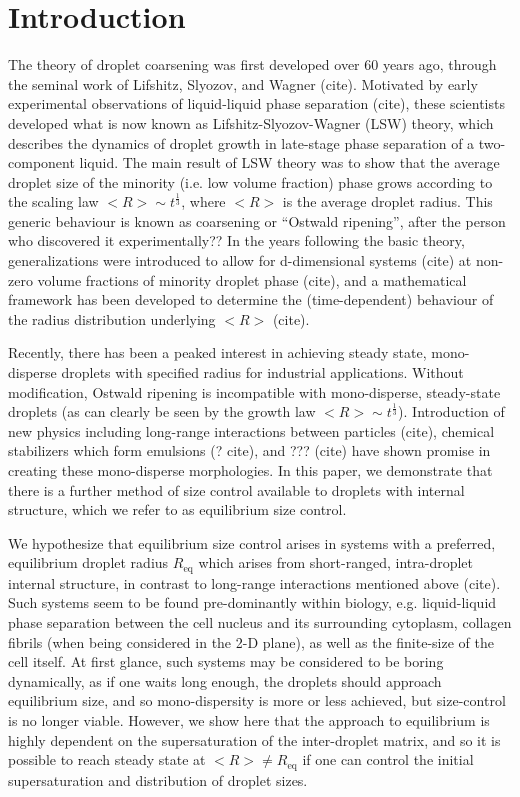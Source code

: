 \documentclass[12pt]{article}
\begin{document}

\section{Introduction}
The theory of droplet coarsening was first developed over 60 years ago, through the seminal work of Lifshitz, Slyozov, and Wagner (cite). Motivated by early experimental observations of liquid-liquid phase separation (cite), these scientists developed what is now known as Lifshitz-Slyozov-Wagner (LSW) theory, which describes the dynamics of droplet growth in late-stage phase separation of a two-component liquid. The main result of LSW theory was to show that the average droplet size of the minority (i.e. low volume fraction) phase grows according to the scaling law $<R>\sim t^{\frac{1}{3}}$, where $<R>$ is the average droplet radius. This generic behaviour is known as coarsening or ``Ostwald ripening'', after the person who discovered it experimentally?? In the years following the basic theory, generalizations were introduced to allow for d-dimensional systems (cite) at non-zero volume fractions of minority droplet phase (cite), and a mathematical framework has been developed to determine the (time-dependent) behaviour of the radius distribution underlying $<R>$ (cite).

Recently, there has been a peaked interest in achieving steady state, mono-disperse droplets with specified radius for industrial applications. Without modification, Ostwald ripening is incompatible with mono-disperse, steady-state droplets (as can clearly be seen by the growth law $<R>\sim t^{\frac{1}{3}}$). Introduction of new physics including long-range interactions between particles (cite), chemical stabilizers which form emulsions (? cite), and ??? (cite) have shown promise in creating these mono-disperse morphologies. In this paper, we demonstrate that there is a further method of size control available to droplets with internal structure, which we refer to as equilibrium size control.

We hypothesize that equilibrium size control arises in systems with a preferred, equilibrium droplet radius $R_{\mathrm{eq}}$ which arises from short-ranged, intra-droplet internal structure, in contrast to long-range interactions mentioned above (cite). Such systems seem to be found pre-dominantly within biology, e.g. liquid-liquid phase separation between the cell nucleus and its surrounding cytoplasm, collagen fibrils (when being considered in the 2-D plane), as well as the finite-size of the cell itself. At first glance, such systems may be considered to be boring dynamically, as if one waits long enough, the droplets should approach equilibrium size, and so mono-dispersity is more or less achieved, but size-control is no longer viable. However, we show here that the approach to equilibrium is highly dependent on the supersaturation of the inter-droplet matrix, and so it is possible to reach steady state at $<R>\neq R_{\mathrm{eq}}$ if one can control the initial supersaturation and distribution of droplet sizes.
\end{document}
